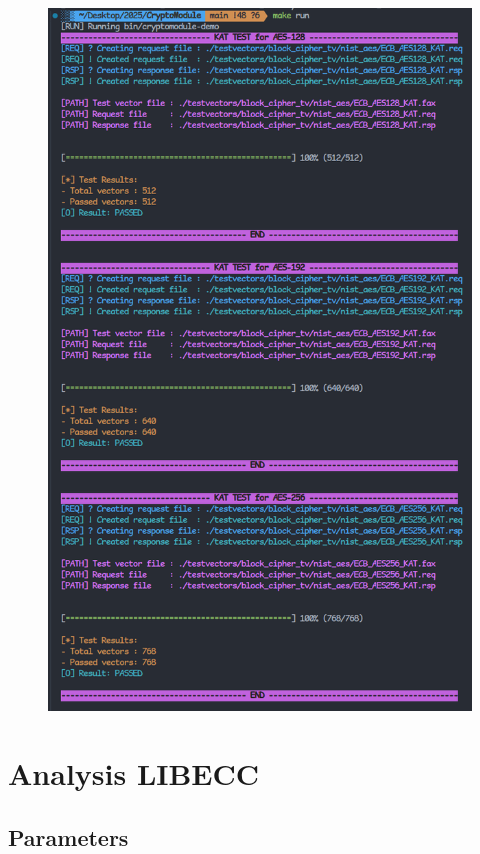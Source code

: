 \documentclass[11pt,a4paper]{report}
\theoremstyle{definitionstyle}
\begin{document}
\begin{figure}[h!]\centering
\includegraphics[scale=.65]{images/make_run}
\end{figure}

\newpage
\chapter{Analysis LIBECC}


\section{Parameters}
\end{document}
